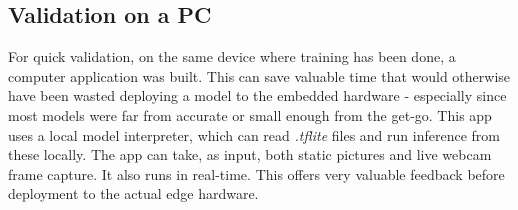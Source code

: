 \subsection{Validation on a PC}
For quick validation, on the same device where training has been done, a computer application was built. This can save valuable time that would otherwise have been wasted deploying a model to the embedded hardware - especially since most models were far from accurate or small enough from the get-go. This app uses a local model interpreter, which can read \textit{.tflite} files and run inference from these locally. The app can take, as input, both static pictures and live webcam frame capture. It also runs in real-time. This offers very valuable feedback before deployment to the actual edge hardware.

